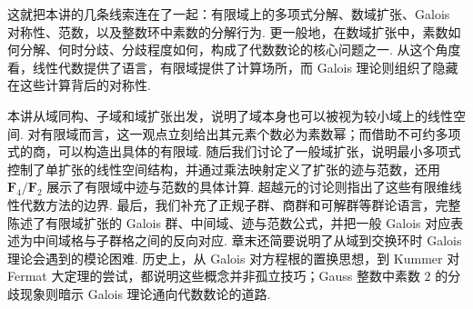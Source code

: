 这就把本讲的几条线索连在了一起：有限域上的多项式分解、数域扩张、Galois 对称性、范数，以及整数环中素数的分解行为. 更一般地，在数域扩张中，素数如何分解、何时分歧、分歧程度如何，构成了代数数论的核心问题之一. 从这个角度看，线性代数提供了语言，有限域提供了计算场所，而 Galois 理论则组织了隐藏在这些计算背后的对称性.

\begin{summary}
    本讲从域同构、子域和域扩张出发，说明了域本身也可以被视为较小域上的线性空间. 对有限域而言，这一观点立刻给出其元素个数必为素数幂；而借助不可约多项式的商，可以构造出具体的有限域. 随后我们讨论了一般域扩张，说明最小多项式控制了单扩张的线性空间结构，并通过乘法映射定义了扩张的迹与范数，还用 $\mathbf{F}_4/\mathbf{F}_2$ 展示了有限域中迹与范数的具体计算. 超越元的讨论则指出了这些有限维线性代数方法的边界. 最后，我们补充了正规子群、商群和可解群等群论语言，完整陈述了有限域扩张的 Galois 群、中间域、迹与范数公式，并把一般 Galois 对应表述为中间域格与子群格之间的反向对应. 章末还简要说明了从域到交换环时 Galois 理论会遇到的模论困难. 历史上，从 Galois 对方程根的置换思想，到 Kummer 对 Fermat 大定理的尝试，都说明这些概念并非孤立技巧；Gauss 整数中素数 $2$ 的分歧现象则暗示 Galois 理论通向代数数论的道路.
\end{summary}

